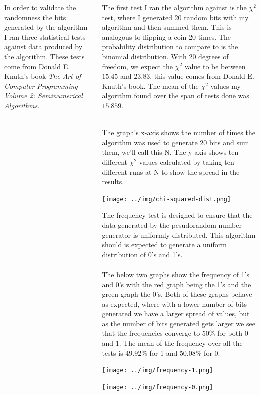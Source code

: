 \documentclass[24pt, landscape]{tikzposter}
\begin{document}
\begin{columns}
{}
{
In order to validate the randomness the bits generated by the algorithm I ran three statistical tests against data produced by the algorithm. These tests come from Donald E. Knuth's book \textit{The Art of Computer Programming --- Volume 2: Seminumerical Algorithms}.
}

\begin{subcolumns}
{
The first test I ran the algorithm against is the $\chi^2$ test, where I generated 20 random bits with my algorithm and then summed them. This is analogous to flipping a coin 20 times. The probability distribution to compare to is the binomial distribution. With 20 degrees of freedom, we expect the $\chi^2$ value to be between $15.45$ and $23.83$, this value comes from Donald E. Knuth's book. The mean of the $\chi^2$ values my algorithm found over the span of tests done was $15.859$.\\
\\
\begin{minipage}{0.15\textwidth}
The graph's x-axis shows the number of times the algorithm was used to generate 20 bits and sum them, we'll call this N. The y-axis shows ten different $\chi^2$ values calculated by taking ten different runs at N to show the spread in the results.
\end{minipage}
\begin{minipage}{0.165\textwidth}
	\begin{tikzfigure}
		\centering
		\texttt{[image: ../img/chi-squared-dist.png]}
	\end{tikzfigure}
\end{minipage}
}
{
The frequency test is designed to ensure that the data generated by the pesudorandom number generator is uniformly distributed. This algorithm should is expected to generate a uniform distribution of 0's and 1's.\\
\\
The below two graphs show the frequency of 1's and 0's with the red graph being the 1's and the green graph the 0's. Both of these graphs behave as expected, where with a lower number of bits generated we have a larger spread of values, but as the number of bits generated gets larger we see that the frequencies converge to 50\% for both 0 and 1. The mean of the frequency over all the tests is $49.92$\% for 1 and $50.08$\% for 0.
\begin{center}
\begin{minipage}{0.13\textwidth}
	\begin{tikzfigure}
		\texttt{[image: ../img/frequency-1.png]}
	\end{tikzfigure}
\end{minipage}
\begin{minipage}{0.13\textwidth}
	\begin{tikzfigure}
		\texttt{[image: ../img/frequency-0.png]}
	\end{tikzfigure}
\end{minipage}
\end{center}
}
\end{subcolumns}


\end{columns}
\end{document}

